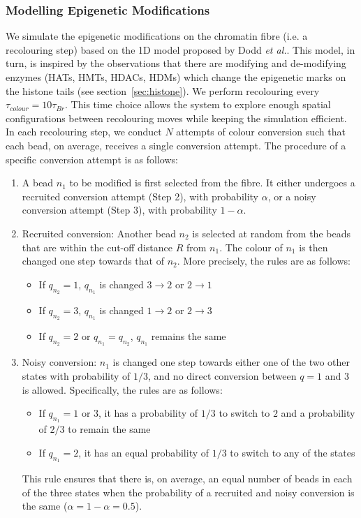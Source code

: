 \documentclass[12pt]{article}
\newcommand{\etal}{\emph{et al.}}
\begin{document}
\subsubsection{Modelling Epigenetic Modifications}
We simulate the epigenetic modifications on the chromatin fibre (i.e. a recolouring step) based on the 1D model proposed by Dodd \etal \cite{dodd2007}. This model, in turn, is inspired by the observations that there are modifying and de-modifying enzymes (HATs, HMTs, HDACs, HDMs) which change the epigenetic marks on the histone tails (see section~\ref{sec:histone}). We perform recolouring every $\tau_{colour} = 10\tau_{Br}$. This time choice allows the system to explore enough spatial configurations between recolouring moves while keeping the simulation efficient. In each recolouring step, we conduct $N$ attempts of colour conversion such that each bead, on average, receives a single conversion attempt. The procedure of a specific conversion attempt is as follows: 

\begin{enumerate}
\item A bead $n_1$ to be modified is first selected from the fibre. It either undergoes a recruited conversion attempt (Step 2), with probability $\alpha$, or a noisy conversion attempt (Step 3), with probability $1 - \alpha$.

\item Recruited conversion: Another bead  $n_2$ is selected at random from the beads that are within the cut-off distance $R$ from $n_1$. The colour of $n_1$ is then changed one step towards that of $n_2$. More precisely, the rules are as follows:
\begin{itemize}
\item If $q_{n_2} = 1$, $q_{n_1}$ is changed $3 \rightarrow 2$ or $2 \rightarrow 1$
\item If $q_{n_2} = 3$, $q_{n_1}$ is changed $1 \rightarrow 2$ or $2 \rightarrow 3$
\item If $q_{n_2} = 2$ or $q_{n_1} = q_{n_2}$, $q_{n_1}$ remains the same
\end{itemize}

\item Noisy conversion:  $n_1$ is changed one step towards either one of the two other states with probability of $1/3$, and no direct conversion between $q  = 1$ and 3 is allowed. Specifically, the rules are as follows:
\begin{itemize}
\item If $q_{n_1} = 1$ or $3$, it has a probability of $1/3$ to switch to $2$ and a probability of $2/3$ to remain the same
\item If $q_{n_1} = 2$, it has an equal probability of $1/3$ to switch to any of the states
\end{itemize}
This rule ensures that there is, on average, an equal number of beads in each of the three states when the probability of a recruited and noisy conversion is the same ($\alpha = 1 - \alpha = 0.5$).
\end{enumerate}
\end{document}
